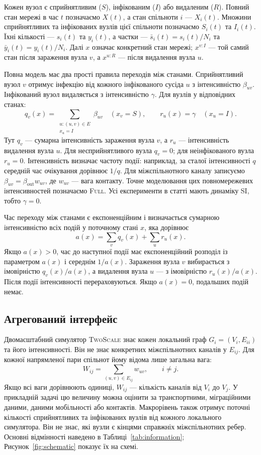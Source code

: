 \documentclass[a4paper,fleqn]{cas-sc}
\newcommand{\ibar}{\bar{y}}
\newcommand{\sbar}{\bar{s}}
\newcommand{\Full}{\textup{\textsc{Full}}}
\newcommand{\TS}{\textup{\textsc{TwoScale}}}
\begin{document}
Кожен вузол є сприйнятливим ($S$), інфікованим ($I$) або видаленим ($R$). Повний стан мережі в час $t$ позначаємо $X(t)$, а стан спільноти $i$ --- $X_i(t)$. Множини сприйнятливих та інфікованих вузлів цієї спільноти позначаємо $S_i(t)$ та $I_i(t)$. Їхні кількості --- $s_i(t)$ та $y_i(t)$, а частки --- $\sbar_i(t)=s_i(t)/N_i$ та $\ibar_i(t)=y_i(t)/N_i$. Далі $x$ означає конкретний стан мережі; $x^{v:I}$ --- той самий стан після зараження вузла $v$, а $x^{u:R}$ --- після видалення вузла $u$.

Повна модель має два прості правила переходів між станами. Сприйнятливий вузол $v$ отримує інфекцію від кожного інфікованого сусіда $u$ з інтенсивністю $\beta_{uv}$. Інфікований вузол видаляється з інтенсивністю $\gamma$. Для вузлів у відповідних станах:
\begin{equation}
\label{eq:full_generator}
q_v(x)=\sum_{\substack{u:(u,v)\in E\\x_u=I}}\beta_{uv}
\quad (x_v=S),
\qquad r_u(x)=\gamma\quad (x_u=I).
\end{equation}
Тут $q_v$ --- сумарна інтенсивність зараження вузла $v$, а $r_u$ --- інтенсивність видалення вузла $u$. Для несприйнятливого вузла $q_v=0$; для неінфікованого вузла $r_u=0$. Інтенсивність визначає частоту події: наприклад, за сталої інтенсивності $q$ середній час очікування дорівнює $1/q$.  Для міжспільнотного каналу записуємо $\beta_{uv}=\beta_{\mathrm{out}}w_{uv}$, де $w_{uv}$ --- вага контакту. Точне моделювання цих повномережевих інтенсивностей позначаємо \Full{}. Усі експерименти в статті мають динаміку SI, тобто $\gamma=0$.

Час переходу між станами є експоненційним і визначається сумарною інтенсивністю всіх подій у поточному стані $x$, яка дорівнює
\[
a(x)=\sum_v q_v(x)+\sum_u r_u(x).
\]
Якщо $a(x)>0$, час до наступної події має експоненційний розподіл із параметром $a(x)$ і середнім $1/a(x)$.
Зараження вузла $v$ вибирається з імовірністю $q_v(x)/a(x)$, а видалення вузла $u$ --- з імовірністю $r_u(x)/a(x)$.
Після події інтенсивності перераховуються.
Якщо $a(x)=0$, подальших подій немає.

\subsection{Агрегований інтерфейс}
\label{sec:interface}

Двомасштабний симулятор \TS{} знає кожен локальний граф $G_i=(V_i,E_{ii})$ та його інтенсивності. Він не знає конкретних міжспільнотних каналів у $E_{ij}$. Для кожної напрямленої пари спільнот йому відома лише загальна вага:
\begin{equation}
\label{eq:weight}
W_{ij}=\sum_{(u,v)\in E_{ij}}w_{uv},\qquad i\neq j.
\end{equation}
Якщо всі ваги дорівнюють одиниці, $W_{ij}$ --- кількість каналів від $V_i$ до $V_j$. У прикладній задачі цю величину можна оцінити за транспортними, міграційними даними, даними мобільності або контактів. Макрорівень також отримує поточні кількості сприйнятливих та інфікованих вузлів від кожного локального симулятора. Він не знає, які вузли є кінцями справжніх міжспільнотних ребер. Основні відмінності наведено в Таблиці~\ref{tab:information}; Рисунок~\ref{fig:schematic} показує їх на схемі.
\end{document}
